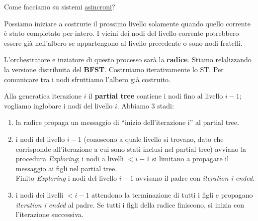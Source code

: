 Come facciamo su sistemi \underline{asincroni}?


Possiamo iniziare a costrurie il prossimo livello solamente quando quello corrente è stato completato per intero.
I vicini dei nodi del livello corrente potrebbero essere già nell'albero se appartengono al livello precedente o sono nodi fratelli.

L'orchestratore e inziatore di questo processo sarà la \textbf{radice}.
Stiamo relalizzando la versione distribuita del \textbf{BFST}. Costruiamo iterativamente lo ST.
Per comunicare tra i nodi sfruttiamo l'albero già costruito.

Alla generatica iterazione $i$ il \textbf{partial tree} contiene i nodi fino al livello $i-1$; vogliamo inglobare i nodi del livello $i$.
Abbiamo 3 stadi:
\begin{enumerate}
  \item la radice propaga un messaggio di ``inizio dell'iterazione i'' al partial tree.
  \item i nodi del livello $i-1$ (conoscono a quale livello si trovano, dato che corrisponde all'iterazione a cui sono stati inclusi nel partial tree)
  avviano la procedura \textit{Exploring}; i nodi a livelli $< i-1$ si limitano a propagare il messaggio ai figli nel partial tree.\\
  Finito \textit{Exploring} i nodi del livello $i-1$ avvisano il padre con \textit{iteration i ended}.
  \item i nodi dei livelli $< i-1$ attendono la terminazione di tutti i figli e propagano \textit{iteration i ended} al padre.
  Se tutti i figli della radice finiscono, si inizia con l'iterazione successiva.
\end{enumerate}

